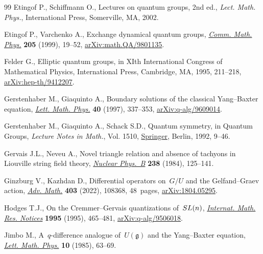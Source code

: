 \documentclass[10pt,a4paper]{article}
\numberwithin{equation}{section}
\begin{document}
\begin{thebibliography}{99}
Etingof P., Schiffmann O., Lectures on quantum groups, 2nd ed., \textit{Lect. Math. Phys.}, International Press, Somerville, MA, 2002.

Etingof P., Varchenko A., Exchange dynamical quantum groups, \href{https://doi.org/10.1007/s002200050665}{\textit{Comm.
 Math. Phys.}} \textbf{205} (1999), 19--52, \href{https://arxiv.org/abs/math.QA/9801135}{arXiv:math.QA/9801135}.

Felder G., Elliptic quantum groups, in X{I}th {I}nternational {C}ongress of
 {M}athematical {P}hysics, International Press, Cambridge, MA, 1995, 211--218,
 \href{https://arxiv.org/abs/hep-th/9412207}{arXiv:hep-th/9412207}.

Gerstenhaber M., Giaquinto A., Boundary solutions of the classical
 {Y}ang--{B}axter equation, \href{https://doi.org/10.1023/A:1007363911649}{\textit{Lett. Math. Phys.}} \textbf{40} (1997),
 337--353, \href{https://arxiv.org/abs/q-alg/9609014}{arXiv:q-alg/9609014}.

Gerstenhaber M., Giaquinto A., Schack S.D., Quantum symmetry, in Quantum
 {G}roups, \textit{Lecture Notes in Math.}, Vol. 1510, \href{https://doi.org/10.1007/BFb0101176}{Springer}, Berlin, 1992,
 9--46.

Gervais J.L., Neveu A., Novel triangle relation and absence of tachyons in
 {L}iouville string field theory, \href{https://doi.org/10.1016/0550-3213(84)90469-3}{\textit{Nuclear Phys.~B}} \textbf{238}
 (1984), 125--141.

Ginzburg V., Kazhdan D., Differential operators on~{$G/U$} and the
 {G}elfand--{G}raev action, \href{https://doi.org/10.1016/j.aim.2022.108368}{\textit{Adv. Math.}} \textbf{403} (2022), 108368,
 48~pages, \href{https://arxiv.org/abs/1804.05295}{arXiv:1804.05295}.

Hodges T.J., On the {C}remmer--{G}ervais quantizations of~{${\rm SL}(n)$},
  \href{https://doi.org/10.1155/S107379289500033X}{\textit{Internat. Math. Res. Notices}} \textbf{1995} (1995), 465--481,
 \href{https://arxiv.org/abs/q-alg/9506018}{arXiv:q-alg/9506018}.

Jimbo M., A~{$q$}-difference analogue of~{$U({\mathfrak{g}})$} and the
 {Y}ang--{B}axter equation, \href{https://doi.org/10.1007/BF00704588}{\textit{Lett. Math. Phys.}} \textbf{10} (1985),
 63--69.


\end{thebibliography}
\end{document}
